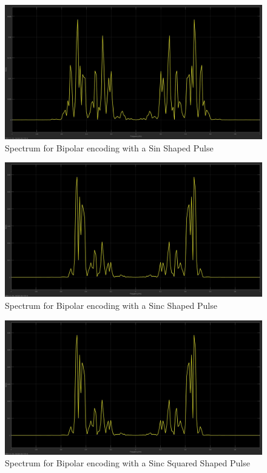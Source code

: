 \documentclass{article}
\begin{document}
\begin{figure}[H]
  \includegraphics[width = \linewidth]{BP_Sin_Spectrum.jpg}
  \caption{Spectrum for Bipolar encoding with a Sin Shaped Pulse}
  \label{fig:BP-Sin-Spectrum}
\end{figure}
\begin{figure}[H]
  \includegraphics[width = \linewidth]{BP_Sinc_Spectrum.jpg}
  \caption{Spectrum for Bipolar encoding with a Sinc Shaped Pulse}
  \label{fig:BP-Sinc-Spectrum}
\end{figure}
\begin{figure}[H]
  \includegraphics[width = \linewidth]{BP_Squared_Spectrum.jpg}
  \caption{Spectrum for Bipolar encoding with a Sinc Squared Shaped Pulse}
  \label{fig:BP-Squared-Spectrum}
\end{figure}
\end{document}
